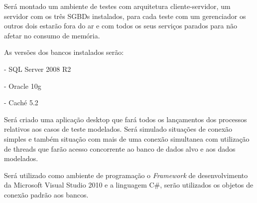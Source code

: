 Será montado um ambiente de testes com arquitetura cliente-servidor, um servidor com os três SGBDs instalados, para cada teste com um gerenciador os outros dois estarão fora do ar e com todos os seus serviços parados para não afetar no consumo de memória.

As versões dos bancos instalados serão:

- SQL Server 2008 R2

- Oracle 10g

- Caché 5.2

Será criado uma aplicação desktop que fará todos os lançamentos dos processos relativos aos casos de teste modelados. Será simulado situações de conexão simples e também situação com mais de uma conexão simultanea com utilização de threads que farão acesso concorrente ao banco de dados alvo e aos dados modelados.

Será utilizado como ambiente de programação o \emph{Framework} de desenvolvimento da Microsoft Visual Studio 2010 e a linguagem C{\#}, serão utilizados os objetos de conexão padrão aos bancos.

 
